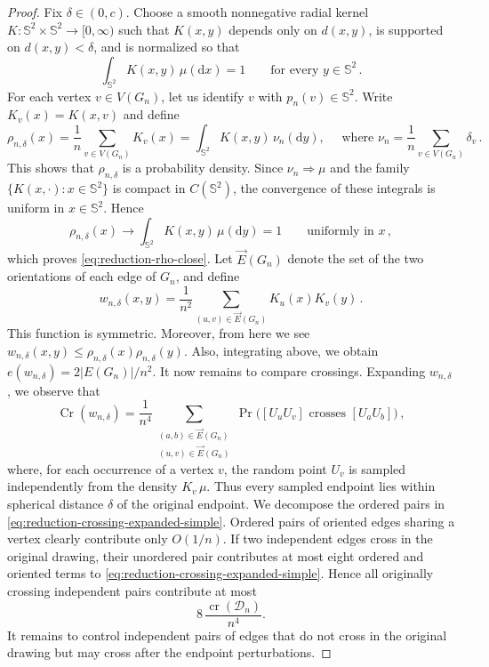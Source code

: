 \documentclass[reqno, 11pt]{amsart}
\theoremstyle{definition}
\newcommand{\dd}{\mathrm{d}}
\begin{document}
\begin{proof}
Fix $\delta \in (0,c)$.  Choose a smooth nonnegative radial kernel $K:{\mathbb S}^2\times{\mathbb S}^2\to[0,\infty)$ such that \(K(x,y)\) depends only on \(d(x,y)\), is supported on \(d(x,y)<\delta\), and is normalized so that
\[
        \int_{{\mathbb S}^2}K(x,y)\,\mu(\dd x)=1
        \qquad\text{for every }y\in{\mathbb S}^2\,.
\]
For each vertex \(v\in V(G_n)\), let us identify $v$ with $p_n(v) \in {\mathbb S}^2$. Write  \(K_v(x)=K(x,v)\) and define
\begin{equation}\label{eq:reduction-rho-definition-simple}
        \rho_{n,\delta}(x)=\frac1n\sum_{v\in V(G_n)}K_v(x)=\int_{{\mathbb S}^2}K(x,y)\,\nu_n(\dd y),
        \quad \text{ where }
        \nu_n=\frac1n\sum_{v\in V(G_n)}\delta_{v}\,.
\end{equation}
This shows that \(\rho_{n,\delta}\) is a probability density.  Since \(\nu_n\Rightarrow\mu\) and the family
\(\{K(x,\cdot):x\in{\mathbb S}^2\}\) is compact in \(C({\mathbb S}^2)\), the convergence of these integrals is uniform in \(x \in {\mathbb S}^2\).  Hence
\[
        \rho_{n,\delta}(x)\to
        \int_{{\mathbb S}^2}K(x,y)\,\mu(\dd y)=1
        \qquad\text{uniformly in }x\,,
\]
which proves \eqref{eq:reduction-rho-close}. Let \(\vec E(G_n)\) denote the set of the two orientations of each edge of \(G_n\), and define
\begin{equation}\label{eq:reduction-w-definition-simple}
         w_{n,\delta}(x,y)
        =
        \frac1{n^2}\sum_{(u,v)\in\vec E(G_n)}K_u(x)K_v(y)\,.
\end{equation}
This function is symmetric.  Moreover, from here we see $  w_{n,\delta}(x,y) \leq \rho_{n,\delta}(x)\rho_{n,\delta}(y)$. Also, integrating above, we obtain $e(w_{n,\delta}) = 2|E(G_n)|/n^2$. It now remains to compare crossings. Expanding \(w_{n, \delta }\), we observe that
\begin{equation}\label{eq:reduction-crossing-expanded-simple}
            \operatorname{Cr}(w_{n,\delta})
        =\frac1{n^4}
        \sum_{\substack{(a,b)\in\vec E(G_n) \\ (u,v)\in\vec E(G_n)}}
        \Pr\bigl([U_uU_v]\text{ crosses }[U_aU_b]\bigr)\,,
\end{equation}
where, for each occurrence of a vertex \(v\), the random point \(U_v\) is sampled independently from the density \(K_v\,\mu\).  Thus every sampled endpoint lies within spherical distance \(\delta\) of the original endpoint. We decompose the ordered pairs in \eqref{eq:reduction-crossing-expanded-simple}.  Ordered pairs of oriented edges sharing a vertex clearly contribute only \(O(1/n)\).   If two independent edges cross in the original drawing, their unordered pair contributes at most eight ordered and oriented terms to \eqref{eq:reduction-crossing-expanded-simple}.  Hence all originally crossing independent pairs contribute at most
\[
        8\,\frac{\operatorname{cr}({\mathcal D}_n)}{n^4}.
\]
It remains to control independent pairs of edges that do not cross in the original drawing but may cross after the endpoint perturbations.


\end{proof}
\end{document}
